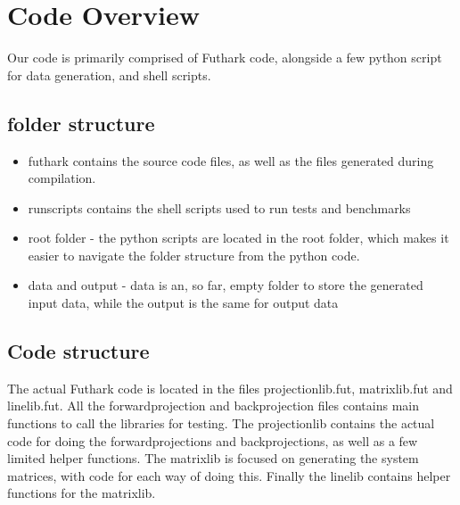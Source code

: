 \section{Code Overview}
Our code is primarily comprised of Futhark code, alongside a few python script for data generation, and shell scripts.

\subsection{folder structure}
\begin{itemize}
  \item futhark contains the source code files, as well as the files generated during compilation.
  \item runscripts contains the shell scripts used to run tests and benchmarks
  \item root folder - the python scripts are located in the root folder, which makes it easier to navigate the folder structure from the python code.
  \item data and output - data is an, so far, empty folder to store the generated input data, while the output is the same for output data
\end{itemize}

\subsection{Code structure}
The actual Futhark code is located in the files projection\-lib.fut, matrix\-lib.fut and line\-lib.fut. All the forwardprojection and backprojection files contains main functions to call the libraries for testing. The projection\-lib contains the actual code for doing the forwardprojections and backprojections, as well as a few limited helper functions. The matrix\-lib is focused on generating the system matrices, with code for each way of doing this. Finally the line\-lib contains helper functions for the matrix\-lib.

